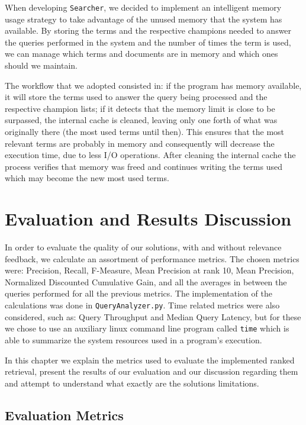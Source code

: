 \documentclass[12pt]{article}
\begin{document}
When developing \texttt{Searcher}, we decided to implement an intelligent memory
usage strategy to take advantage of the unused memory that the system has available. 
By storing the terms and the respective champions needed to answer the queries 
performed in the system and the number of times the term is used, we can manage 
which terms and documents are in memory and which ones should we maintain.

The workflow that we adopted consisted in: if the program has memory available, 
it will store the terms used to answer the query being processed and the 
respective champion lists; if it detects that the memory limit is close to be 
surpassed, the internal cache is cleaned, leaving only one forth of what was 
originally there (the most used terms until then). 
This ensures that the most relevant terms are probably in memory and consequently 
will decrease the execution time, due to less I/O operations. 
After cleaning the internal cache the process verifies that memory was freed and 
continues writing the terms used which may become the new most used terms.

\newpage
\section{Evaluation and Results Discussion}

In order to evaluate the quality of our solutions, with and without relevance 
feedback, we calculate an assortment of performance metrics.
The chosen metrics were: Precision, Recall, F-Measure, Mean Precision at rank 10, 
Mean Precision, Normalized Discounted Cumulative Gain, and all the averages in 
between the queries performed for all the previous metrics.
The implementation of the calculations was done in \texttt{QueryAnalyzer.py}.
Time related metrics were also considered, such as: Query Throughput and Median 
Query Latency, but for these we chose to use an auxiliary linux command line 
program called \texttt{time} which is able to summarize the system resources 
used in a program's execution.

In this chapter we explain the metrics used to evaluate the implemented ranked
retrieval, present the results of our evaluation and our discussion regarding 
them and attempt to understand what exactly are the solutions limitations.

\subsection{Evaluation Metrics} \label{metrics}
\end{document}
